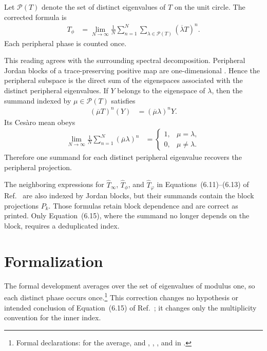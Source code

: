 \documentclass{article}
\begin{document}
Let $\mathcal P(T)$ denote the set of distinct eigenvalues of $T$ on the unit
circle. The corrected formula is
\begin{align}
    T_\phi
        &=\lim_{N\to\infty}\frac{1}{N}
          \sum_{n=1}^{N}
          \sum_{\lambda\in\mathcal P(T)}
          (\overline{\lambda}T)^n.
    \label{eq:wolf_ch6_eq615_deduplicated_phases_distinct_phase_formula}
\end{align}
Each peripheral phase is counted once.

This reading agrees with the surrounding spectral decomposition. Peripheral
Jordan blocks of a trace-preserving positive map are one-dimensional
\cite[Chapter~6]{Wolf2012Quantum}. Hence the peripheral subspace is the
direct sum of the eigenspaces associated with the distinct peripheral
eigenvalues. If $Y$ belongs to the eigenspace of $\lambda$, then the summand
indexed by $\mu\in\mathcal P(T)$ satisfies
\begin{align}
    (\overline{\mu}T)^n(Y)
        &=(\overline{\mu}\lambda)^nY.
    \label{eq:wolf_ch6_eq615_deduplicated_phases_action_on_eigenspace}
\end{align}
Its Ces\`aro mean obeys
\begin{align}
    \lim_{N\to\infty}\frac{1}{N}
        \sum_{n=1}^{N}(\overline{\mu}\lambda)^n
        &=
        \begin{cases}
            1,&\mu=\lambda,\\
            0,&\mu\neq\lambda.
        \end{cases}
    \label{eq:wolf_ch6_eq615_deduplicated_phases_phase_orthogonality}
\end{align}
Therefore one summand for each distinct peripheral eigenvalue recovers the
peripheral projection.

The neighboring expressions for $\widehat T_\infty$, $\widehat T_\phi$, and
$\widehat T_\varphi$ in Equations~(6.11)--(6.13) of
Ref.~\cite{Wolf2012Quantum} are also indexed by Jordan blocks, but their
summands contain the block projections $P_k$. Those formulas retain block
dependence and are correct as printed. Only Equation~(6.15), where the
summand no longer depends on the block, requires a deduplicated index.

\section{Formalization}

The formal development averages over the set of eigenvalues of modulus one,
so each distinct phase occurs once.\footnote{Formal declarations:
     for the average, and
    ,
    ,
    ,
    and
    in .}
This correction changes no hypothesis or intended conclusion of
Equation~(6.15) of Ref.~\cite{Wolf2012Quantum}; it changes only the
multiplicity convention for the inner index.
\end{document}
